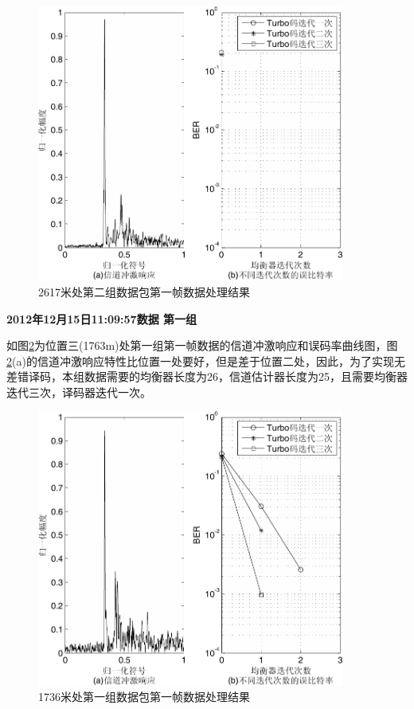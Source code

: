 \begin{figure}[htb]
  \begin{center}
    \includegraphics[width=0.9\textwidth]{images/result_2_2.pdf}
  \end{center}
  \caption{2617米处第二组数据包第一帧数据处理结果}
  \label{fig:6.12}
\end{figure}

\textbf{\sihao 2012年12月15日11:09:57数据 第一组} 

如图\ref{fig:6.13}为位置三(1763m)处第一组第一帧数据的信道冲激响应和误码率曲线图，图\ref{fig:6.13}(a)的信道冲激响应特性比位置一处要好，但是差于位置二处，因此，为了实现无差错译码，本组数据需要的均衡器长度为26，信道估计器长度为25，且需要均衡器迭代三次，译码器迭代一次。

\begin{figure}[htb]
  \begin{center}
    \includegraphics[width=0.9\textwidth]{images/result_3_1.pdf}
  \end{center}
  \caption{1736米处第一组数据包第一帧数据处理结果}
  \label{fig:6.13}
\end{figure}

